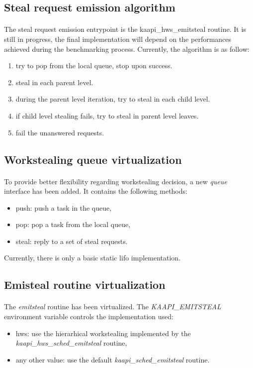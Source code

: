 \documentclass[a4paper, 11pt]{article}
\begin{document}
\subsection{Steal request emission algorithm}
\paragraph{}
The steal request emission entrypoint is the kaapi\_hws\_emitsteal routine. It
is still in progress, the final implementation will depend on the performances
achieved during the benchmarking process. Currently, the algorithm is as follow:
\begin{enumerate}
\item try to pop from the local queue, stop upon success.
\item steal in each parent level.
\item during the parent level iteration, try to steal in each child level.
\item if child level stealing fails, try to steal in parent level leaves.
\item fail the unanswered requests.
\end{enumerate}

\subsection{Workstealing queue virtualization}
\paragraph{}
To provide better flexibility regarding workstealing decision, a new \textit{queue}
interface has been added. It contains the following methods:
\begin{itemize}
  \item push: push a task in the queue,
  \item pop: pop a task from the local queue,
  \item steal: reply to a set of steal requests.
\end{itemize}
Currently, there is only a basic static lifo implementation.

\subsection{Emisteal routine virtualization}
\paragraph{}
The \textit{emitsteal} routine has been virtualized. The
\textit{KAAPI\_EMITSTEAL} environment variable controls the
implementation used:
\begin{itemize}
\item hws: use the hierarhical workstealing implemented by the
\textit{kaapi\_hws\_sched\_emitsteal} routine,
\item any other value: use the default \textit{kaapi\_sched\_emitsteal} routine.
\end{itemize}
\end{document}
